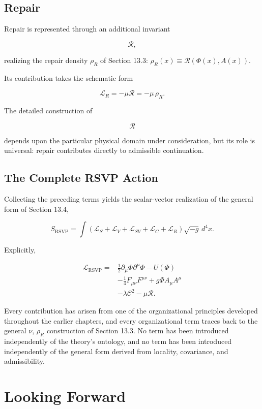 \documentclass[11pt,oneside]{book}
\numberwithin{equation}{chapter}
\theoremstyle{definition}
\theoremstyle{plain}
\begin{document}
\subsection*{Repair}

Repair is represented through an additional invariant

\[
\mathcal R,
\]

realizing the repair density \(\rho_R\) of Section 13.3: \(\rho_R(x)
\equiv\mathcal R(\Phi(x),A(x))\).

Its contribution takes the schematic form

\[
\mathcal L_R
=
-
\mu
\mathcal R
=
-\mu\,\rho_R.
\]

The detailed construction of

\[
\mathcal R
\]

depends upon the particular physical domain under consideration, but its role is universal: repair contributes directly to admissible continuation.

\subsection*{The Complete RSVP Action}

Collecting the preceding terms yields the scalar-vector realization of the
general form of Section 13.4,

\[
S_{\mathrm{RSVP}}
=
\int
\left(
\mathcal L_S
+
\mathcal L_V
+
\mathcal L_{SV}
+
\mathcal L_C
+
\mathcal L_R
\right)
\sqrt{-g}\,
d^4x.
\]

Explicitly,

\[
\boxed{
\begin{aligned}
\mathcal L_{\mathrm{RSVP}}
=
&
\frac12
\partial_\mu\Phi
\partial^\mu\Phi
-
U(\Phi)
\\
&
-
\frac14
F_{\mu\nu}F^{\mu\nu}
+
g\Phi A_\mu A^\mu
\\
&
-
\lambda
\mathcal C^2
-
\mu
\mathcal R.
\end{aligned}
}
\]

Every contribution has arisen from one of the organizational principles
developed throughout the earlier chapters, and every organizational term
traces back to the general \(\nu\), \(\rho_R\) construction of Section 13.3.
No term has been introduced independently of the theory's ontology, and no
term has been introduced independently of the general form derived from
locality, covariance, and admissibility.

\section{Looking Forward}
\end{document}
